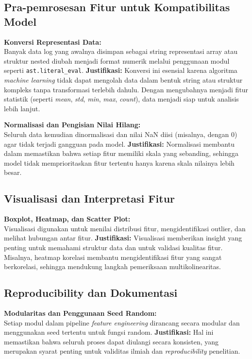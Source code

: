 \subsection{Pra-pemrosesan Fitur untuk Kompatibilitas Model}
\label{sec:praPemrosesanFitur}
\textbf{Konversi Representasi Data:} \\
Banyak data log yang awalnya disimpan sebagai string representasi array atau struktur nested diubah menjadi format numerik melalui penggunaan modul seperti \texttt{ast.literal\_eval}.
\textbf{Justifikasi:} Konversi ini esensial karena algoritma \textit{machine learning} tidak dapat mengolah data dalam bentuk string atau struktur kompleks tanpa transformasi terlebih dahulu. Dengan mengubahnya menjadi fitur statistik (seperti \textit{mean}, \textit{std}, \textit{min}, \textit{max}, \textit{count}), data menjadi siap untuk analisis lebih lanjut.

\textbf{Normalisasi dan Pengisian Nilai Hilang:} \\
Seluruh data kemudian dinormalisasi dan nilai NaN diisi (misalnya, dengan 0) agar tidak terjadi gangguan pada model.
\textbf{Justifikasi:} Normalisasi membantu dalam memastikan bahwa setiap fitur memiliki skala yang sebanding, sehingga model tidak memprioritaskan fitur tertentu hanya karena skala nilainya lebih besar.

\subsection{Visualisasi dan Interpretasi Fitur}
\label{sec:visualisasiInterpretasiFitur}
\textbf{Boxplot, Heatmap, dan Scatter Plot:} \\
Visualisasi digunakan untuk menilai distribusi fitur, mengidentifikasi outlier, dan melihat hubungan antar fitur.
\textbf{Justifikasi:} Visualisasi memberikan insight yang penting untuk memahami struktur data dan untuk validasi kualitas fitur. Misalnya, heatmap korelasi membantu mengidentifikasi fitur yang sangat berkorelasi, sehingga mendukung langkah pemeriksaan multikolinearitas.

\subsection{Reproducibility dan Dokumentasi}
\label{sec:reproducibilityDokumentasi}
\textbf{Modularitas dan Penggunaan Seed Random:} \\
Setiap modul dalam pipeline \textit{feature engineering} dirancang secara modular dan menggunakan seed tertentu untuk fungsi random.
\textbf{Justifikasi:} Hal ini memastikan bahwa seluruh proses dapat diulangi secara konsisten, yang merupakan syarat penting untuk validitas ilmiah dan \textit{reproducibility} penelitian.

